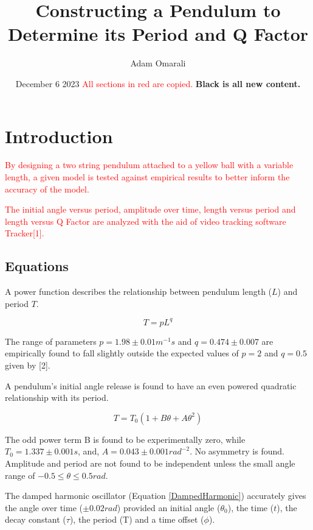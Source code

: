 \documentclass[12pt,twocolumn]{article}
\begin{document}
\title{\bf{Constructing a Pendulum to Determine its Period and
Q Factor}}
\author{Adam Omarali}
\date{December 6 2023 \linebreak
\textcolor{red}{All sections in red are copied.} \bf{Black is all new content.}
}
\maketitle

\section{Introduction}

\textcolor{red}{By designing a two string pendulum attached
to a yellow ball with a variable length, a given
model is tested against empirical results to
better inform the accuracy of the model.}

\textcolor{red}{The initial angle versus period, amplitude
over time, length versus period and length
versus Q Factor are analyzed with the aid of
video tracking software Tracker[1].}

\subsection*{Equations}

A power function describes the relationship between pendulum length ($L$) and period $T$.

\begin{equation}
    \label{Emp_Period}
    T = p L^q
\end{equation}

The range of parameters $p = 1.98 \pm 0.01 m^{-1}s$ and
$q = 0.474 \pm 0.007$ are empirically found to fall slightly outside the 
expected values of $p = 2$ and $q=0.5$ given by [2].

A pendulum's initial angle release is found to have an even powered quadratic relationship with its period.

\begin{equation}
    \label{Period_Angle}
    T = T_0 (1 + B\theta + A\theta^2)
\end{equation}

The odd power term B is found to be experimentally zero, while $T_0 = 1.337 \pm 0.001 s$,
and, $A = 0.043 \pm 0.001 rad^{-2}$. No asymmetry is found.
Amplitude and period are not found to be independent 
unless the small angle range of $-0.5 \leq \theta \leq 0.5 rad$.

The damped harmonic oscillator (Equation \ref{DampedHarmonic}) accurately gives the
angle over time ($\pm 0.02rad$) provided an initial
angle ($\theta_0$), the time ($t$), the decay constant
($\tau$), the period (T) and a time offset ($\phi$).
\end{document}
